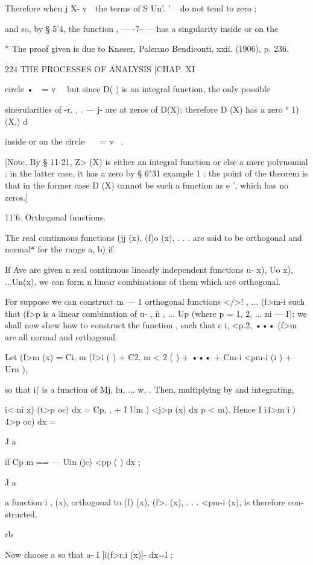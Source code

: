 {Therefore when j X- v~\ the terms of S Un'. ' ~ do not tend to zero ;

and so, by § 5'4, the function , — -7- — has a singularity inside or
on the

* The proof given is due to Kneser, Palermo Bendiconti, xxii. (1906),
p. 236.



224 THE PROCESSES OF ANALYSIS [CHAP. XI

circle •\ \ = v~ \ but since D( ) is an integral function, the only
possible

sinerularities of -r. , . — j- are at zeros of D(X); therefore D (X)
has a zero ° 1) (X,) d\

inside or on the circle \ \ \ = v~ .

[Note. By § 11-21, Z> (X) is either an integral function or else a
mere polynomial ; in the latter case, it has a zero by § 6"31 example
1 ; the point of the theorem is that in the former case D (X) cannot
be such a function as e ', which has no zeros.]

11'6. Orthogonal functions.

The real continuous functions (jj (x), (f)o (x), . . . are said to be
orthogonal and normal* for the range a, b) if

If Ave are given n real continuous linearly independent functions u-
x), Uo x), ...Un(x), we can form n linear combinations of them which
are orthogonal.

For suppose we can construct m — 1 orthogonal functions </>! , ...
(f>m-i such that (f>p is a linear combination of u- , ii , ... Up
(where p = 1, 2, ... ni — I); we shall now shew how to construct the
function , such that c i, <p.2, ••• (f>m are all normal and
orthogonal.

Let (f>m (x) = Ci, m (f>i ( ) + C2, m < 2 ( ) + ••• + Cm-i <pm-i (i )
+ Urn ),

so that i( is a function of Mj, lu, ... w, . Then, multiplying by and
integrating,

i< ni x) (t>p oc) dx = Cp, , + I Um ) <j>p (x) dx p < m). Hence I i4>m
i ) 4>p oc) dx =

J a

if Cp m == — Uin (jc) <pp ( ) dx ;

J a

a function i , (x), orthogonal to (f) (x), (f>. (x), . . . <pm-i (x),
is therefore con- structed.

rb

Now choose a so that a- I [i(f>r,i (x)]- dx=l ;

}
